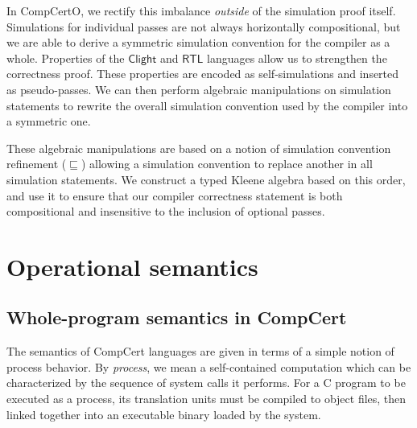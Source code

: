 \documentclass[draft,11pt]{report}
\newcommand{\kw}[1]{\ensuremath{ \mathsf{#1} }}
\newcommand{\scref}{\sqsubseteq} %
\begin{document}
In CompCertO,
we rectify this imbalance \emph{outside}
of the simulation proof itself.
Simulations for individual passes are not always
horizontally compositional,
but we are able to derive a symmetric simulation convention
for the compiler as a whole.
Properties of the $\kw{Clight}$ and $\kw{RTL}$ languages
allow us to strengthen the correctness proof.
These properties are encoded as self-simulations
and inserted as pseudo-passes.
We can then perform algebraic manipulations
on simulation statements
to rewrite the overall simulation convention
used by the compiler into a symmetric one.

These algebraic manipulations are
based on a notion of
simulation convention refinement ($\scref$)
allowing a simulation convention
to replace another in all simulation statements.
We construct a typed Kleene algebra \cite{tka}
based on this order,
and use it to ensure that
our compiler correctness statement
is both compositional
and insensitive to the inclusion of optional passes.


\section{Operational semantics} \label{sec:sem} %


\subsection{Whole-program semantics in CompCert} \label{sec:sem:closed} %

The semantics of CompCert languages
are given in terms of a simple notion of process behavior.
By \emph{process}, we mean a self-contained computation
which can be characterized by
the sequence of system calls it performs.
For a C program to be executed as a process,
its translation units must be compiled to object files,
then linked together
into an executable binary
loaded by the system.
\end{document}
